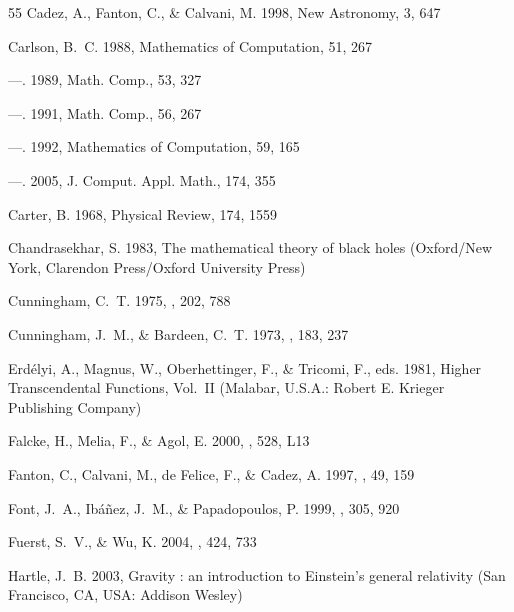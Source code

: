 \documentclass[apj]{emulateapj}
\begin{document}
\begin{thebibliography}{55}
{Cadez}, A., {Fanton}, C., \& {Calvani}, M. 1998, New Astronomy, 3, 647

Carlson, B.~C. 1988, Mathematics of Computation, 51, 267

---. 1989, Math. Comp., 53, 327

---. 1991, Math. Comp., 56, 267

---. 1992, Mathematics of Computation, 59, 165

---. 2005, J. Comput. Appl. Math., 174, 355

{Carter}, B. 1968, Physical Review, 174, 1559

{Chandrasekhar}, S. 1983, {The mathematical theory of black holes} (Oxford/New
  York, Clarendon Press/Oxford University Press)

{Cunningham}, C.~T. 1975, \apj, 202, 788

{Cunningham}, J.~M., \& {Bardeen}, C.~T. 1973, \apj, 183, 237

Erd{\'{e}}lyi, A., Magnus, W., Oberhettinger, F., \& Tricomi, F., eds. 1981,
  Higher Transcendental Functions, Vol.~II (Malabar, U.S.A.: Robert E. Krieger
  Publishing Company)

{Falcke}, H., {Melia}, F., \& {Agol}, E. 2000, \apjl, 528, L13

{Fanton}, C., {Calvani}, M., {de Felice}, F., \& {Cadez}, A. 1997, \pasj, 49,
  159

{Font}, J.~A., {Ib{\'a}{\~n}ez}, J.~M., \& {Papadopoulos}, P. 1999, \mnras,
  305, 920

{Fuerst}, S.~V., \& {Wu}, K. 2004, \aap, 424, 733

{Hartle}, J.~B. 2003, {Gravity : an introduction to Einstein's general
  relativity} (San Francisco, CA, USA: Addison Wesley)


\end{thebibliography}
\end{document}
